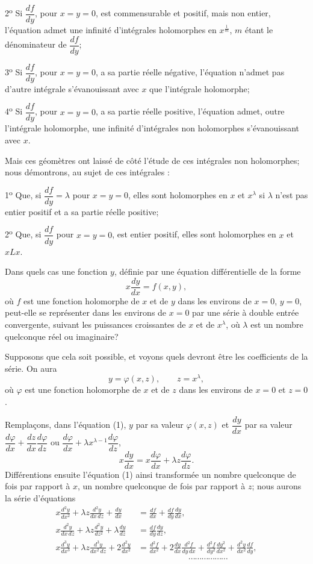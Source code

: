 \documentclass[11pt]{article}
\begin{document}
2\textsuperscript{o} Si $\dfrac{df}{dy}$, pour $x=y=0$, est commensurable et positif, mais non entier, l’équation admet une infinité d’intégrales holomorphes en $x^{\frac1m}$, $m$ étant le dénominateur de $\dfrac{df}{dy}$;

3\textsuperscript{o} Si $\dfrac{df}{dy}$, pour $x=y=0$, a sa partie réelle négative, l’équation n’admet pas d’autre intégrale s’évanouissant avec $x$ que l’intégrale holomorphe;

4\textsuperscript{o} Si $\dfrac{df}{dy}$, pour $x=y=0$, a sa partie réelle positive, l’équation admet, outre l’intégrale holomorphe, une infinité d’intégrales non holomorphes s’évanouissant avec $x$.

Mais ces géomètres ont laissé de côté l’étude de ces intégrales non holomorphes; nous démontrons, au sujet de ces intégrales :

1\textsuperscript{o} Que, si $\dfrac{df}{dy}=\lambda$ pour $x=y=0$, elles sont holomorphes en $x$ et $x^\lambda$ si $\lambda$ n’est pas entier positif et a sa partie réelle positive;

2\textsuperscript{o} Que, si $\dfrac{df}{dy}$ pour $x=y=0$, est entier positif, elles sont holomorphes en $x$ et $xLx$.

Dans quels cas une fonction $y$, définie par une équation différentielle de la forme
\begin{equation*}\tag{1}
x\frac{dy}{dx}=f(x,y),
\end{equation*}
où $f$ est une fonction holomorphe de $x$ et de $y$ dans les environs de $x=0$, $y=0$, peut-elle se représenter dans les environs de $x=0$ par une série à double entrée convergente, suivant les puissances croissantes de $x$ et de $x^\lambda$, où $\lambda$ est un nombre quelconque réel ou imaginaire?

Supposons que cela soit possible, et voyons quels devront être les coefficients de la série. On aura
\[
y=\varphi(x,z),\qquad z=x^\lambda,
\]
où $\varphi$ est une fonction holomorphe de $x$ et de $z$ dans les environs de $x=0$ et $z=0$.

Remplaçons, dans l’équation (1), $y$ par sa valeur $\varphi(x,z)$ et $\dfrac{dy}{dx}$ par sa valeur $\dfrac{d\varphi}{dx}+\dfrac{dz}{dx}\dfrac{d\varphi}{dz}$ ou $\dfrac{d\varphi}{dx}+\lambda x^{\lambda-1}\dfrac{d\varphi}{dz}$,
\[
x\frac{dy}{dx}=x\frac{d\varphi}{dx}+\lambda z\frac{d\varphi}{dz}.
\]
Différentions ensuite l’équation (1) ainsi transformée un nombre quelconque de fois par rapport à $x$, un nombre quelconque de fois par rapport à $z$; nous aurons la série d’équations
\begin{align*}
x\frac{d^2y}{dx^2}+\lambda z\frac{d^2y}{dx\,dz}+\frac{dy}{dx}
&=\frac{df}{dx}+\frac{df}{dy}\frac{dy}{dx},\\
x\frac{d^2y}{dx\,dz}+\lambda z\frac{d^2y}{dz^2}+\lambda\frac{dy}{dz}
&=\frac{df}{dy}\frac{dy}{dz},\\
x\frac{d^3y}{dx^3}+\lambda z\frac{d^3y}{dx^2\,dz}+2\frac{d^2y}{dx^2}
&=\frac{d^2f}{dx^2}+2\frac{dy}{dx}\frac{d^2f}{dy\,dx}+\frac{d^2f}{dy^2}\frac{dy^2}{dx^2}+\frac{d^2y}{dx^2}\frac{df}{dy},\\[-0.2em]
&\hspace{6em}\cdots\cdots\cdots\cdots\cdots\cdots
\end{align*}
\end{document}
